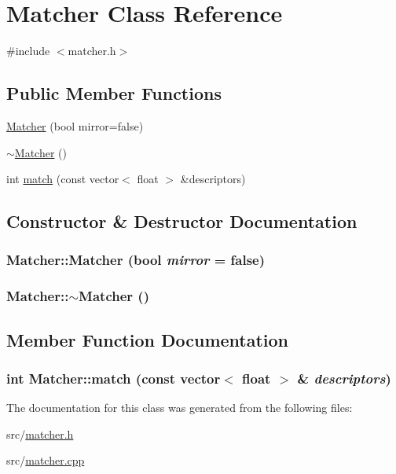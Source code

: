 \hypertarget{class_matcher}{
\section{Matcher Class Reference}
\label{class_matcher}
}


{\ttfamily \#include $<$matcher.h$>$}

\subsection*{Public Member Functions}
\begin{DoxyCompactItemize}
\item 
\hyperlink{class_matcher_a254e6a060fa3843d8f700e9e226991a2}{Matcher} (bool mirror=false)
\item 
\hyperlink{class_matcher_adb99ad379498c429f93a8ae851ad75c3}{$\sim$Matcher} ()
\item 
int \hyperlink{class_matcher_a243d7e85b90e22f333c2e31a4b96c73c}{match} (const vector$<$ float $>$ \&descriptors)
\end{DoxyCompactItemize}


\subsection{Constructor \& Destructor Documentation}
\hypertarget{class_matcher_a254e6a060fa3843d8f700e9e226991a2}{
\subsubsection[{Matcher}]{\setlength{\rightskip}{0pt plus 5cm}Matcher::Matcher (bool {\em mirror} = {\ttfamily false})}}
\label{class_matcher_a254e6a060fa3843d8f700e9e226991a2}
\hypertarget{class_matcher_adb99ad379498c429f93a8ae851ad75c3}{
\subsubsection[{$\sim$Matcher}]{\setlength{\rightskip}{0pt plus 5cm}Matcher::$\sim$Matcher ()}}
\label{class_matcher_adb99ad379498c429f93a8ae851ad75c3}


\subsection{Member Function Documentation}
\hypertarget{class_matcher_a243d7e85b90e22f333c2e31a4b96c73c}{
\subsubsection[{match}]{\setlength{\rightskip}{0pt plus 5cm}int Matcher::match (const vector$<$ float $>$ \& {\em descriptors})}}
\label{class_matcher_a243d7e85b90e22f333c2e31a4b96c73c}


The documentation for this class was generated from the following files:\begin{DoxyCompactItemize}
\item 
src/\hyperlink{matcher_8h}{matcher.h}\item 
src/\hyperlink{matcher_8cpp}{matcher.cpp}\end{DoxyCompactItemize}
